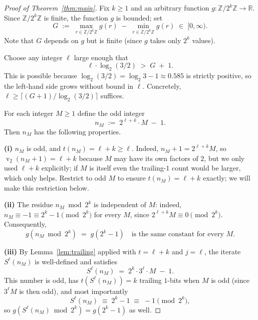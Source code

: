 \documentclass[11pt,a4paper]{article}
\theoremstyle{definition}
\theoremstyle{remark}
\DeclareMathOperator{\val}{v}
\newcommand{\Z}{\mathbb{Z}}
\newcommand{\R}{\mathbb{R}}
\begin{document}
\begin{proof}[Proof of Theorem~\ref{thm:main}]
Fix $k \geq 1$ and an arbitrary function $g \colon \Z / 2^k \Z \to \R$.
Since $\Z / 2^k \Z$ is finite, the function $g$ is bounded; set
\begin{equation}\label{eq:def-G}
  G \;:=\; \max_{r \in \Z / 2^k \Z} g(r) \;-\; \min_{r \in \Z / 2^k \Z}
  g(r) \;\in\; [0, \infty).
\end{equation}
Note that $G$ depends on $g$ but is finite (since $g$ takes only $2^k$
values).

Choose any integer $\ell$ large enough that
\begin{equation}\label{eq:ell-choice}
  \ell \cdot \log_2(3/2) \;>\; G \;+\; 1.
\end{equation}
This is possible because $\log_2(3/2) = \log_2 3 - 1 \approx 0.585$ is
strictly positive, so the left-hand side grows without bound in $\ell$.
Concretely, $\ell \geq \lceil (G + 1) / \log_2(3/2) \rceil$ suffices.

For each integer $M \geq 1$ define the odd integer
\begin{equation}\label{eq:def-n}
  n_M \;:=\; 2^{\ell + k} \cdot M \;-\; 1.
\end{equation}
Then $n_M$ has the following properties.

\medskip
\noindent\textbf{(i)} $n_M$ is odd, and $t(n_M) = \ell + k \geq \ell$.
Indeed, $n_M + 1 = 2^{\ell + k} M$, so $\val_2(n_M + 1) = \ell + k$
because $M$ may have its own factors of $2$, but we only used
$\ell + k$ explicitly; if $M$ is itself even the trailing-$1$ count
would be larger, which only helps.  Restrict to odd $M$ to ensure
$t(n_M) = \ell + k$ exactly; we will make this restriction below.

\medskip
\noindent\textbf{(ii)} The residue $n_M \bmod 2^k$ is independent of
$M$: indeed, $n_M \equiv -1 \equiv 2^k - 1 \pmod{2^k}$ for every $M$,
since $2^{\ell + k} M \equiv 0 \pmod{2^k}$.  Consequently,
\[
  g(n_M \bmod 2^k) \;=\; g(2^k - 1)
  \quad\text{is the same constant for every } M.
\]

\medskip
\noindent\textbf{(iii)} By Lemma~\ref{lem:trailing} applied with
$t = \ell + k$ and $j = \ell$, the iterate $S^\ell(n_M)$ is well-defined
and satisfies
\[
  S^\ell(n_M) \;=\; 2^{k} \cdot 3^\ell \cdot M \;-\; 1.
\]
This number is odd, has $t(S^\ell(n_M)) = k$ trailing $1$-bits when
$M$ is odd (since $3^\ell M$ is then odd), and most importantly
\[
  S^\ell(n_M) \;\equiv\; 2^k - 1 \;\equiv\; -1 \pmod{2^k},
\]
so $g(S^\ell(n_M) \bmod 2^k) = g(2^k - 1)$ as well.


\end{proof}
\end{document}
